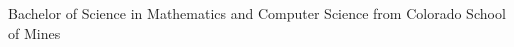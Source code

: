 
\begin{scholarship}
					{Bachelor of Science in Mathematics and Computer Science from Colorado School of Mines}
\end{scholarship}
